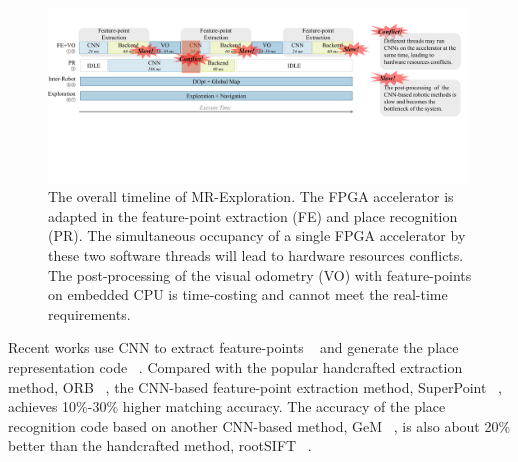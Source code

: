 



\begin{figure}[t]
    \centering
    \includegraphics[width=0.99\textwidth]{fig/overalltime.pdf} 	
    \vspace{-2mm}
    \caption{
    The overall timeline of MR-Exploration. The FPGA accelerator is adapted in the feature-point extraction (FE) and place recognition (PR). The simultaneous occupancy of a single FPGA accelerator by these two software threads will lead to hardware resources conflicts. The post-processing of the visual odometry (VO) with feature-points on embedded CPU is time-costing and cannot meet the real-time requirements.
    }
	\label{fig:overalltime}
\end{figure}

Recent works use CNN to extract feature-points  ~\cite{detone2018superpoint, simo2015discriminative, yi2016lift} and generate the place representation code  ~\cite{arandjelovic2016netvlad, radenovic2018fine}. 
Compared with the popular handcrafted extraction method, ORB ~\cite{Mur-Artal:2017281}, the CNN-based feature-point extraction method, SuperPoint  ~\cite{detone2018superpoint}, achieves 10\%-30\% higher matching accuracy.
The accuracy of the place recognition code based on another CNN-based method, GeM  ~\cite{radenovic2018fine}, is also about 20\% better than the handcrafted method, rootSIFT  ~\cite{jegou2014triang}.

